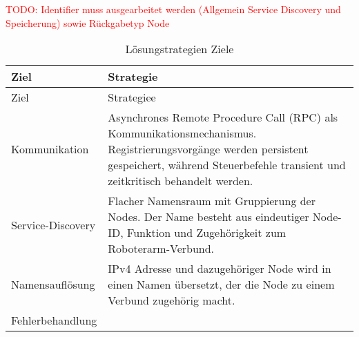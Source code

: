 \textcolor{red}{TODO: Identifier muss ausgearbeitet werden (Allgemein Service Discovery und Speicherung) sowie Rückgabetyp Node}\\


\begin{longtable}{|>{\raggedright\arraybackslash}p{4cm}|>{\raggedright\arraybackslash}p{10cm}|}
	\caption{Lösungstrategien Ziele} \label{tab:loesungsstrategieZiele} \\
	\hline
	Ziel & Strategie \\
	\hline
	\endfirsthead
	
	\hline
	Ziel & Strategiee\\
	\hline
	\endhead
	
	\hline
	\endfoot
	
	Kommunikation &
	Asynchrones Remote Procedure Call (RPC) als Kommunikationsmechanismus. Registrierungsvorgänge werden persistent gespeichert, während Steuerbefehle transient und zeitkritisch behandelt werden.  
	\\
	\hline
	Service-Discovery &
	Flacher Namensraum mit Gruppierung der Nodes. Der Name besteht aus eindeutiger Node-ID, Funktion und Zugehörigkeit zum Roboterarm-Verbund. 
	\\
	\hline
	Namensauflösung
	& IPv4 Adresse und dazugehöriger Node wird in einen Namen übersetzt, der die Node zu einem Verbund zugehörig macht.  
	\\
	\hline
	Fehlerbehandlung
	& 
	
	
\end{longtable}


